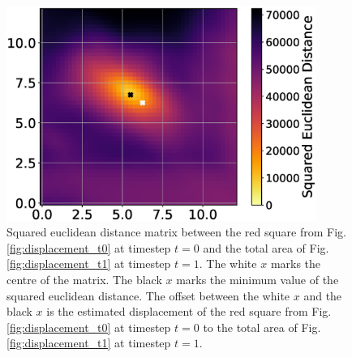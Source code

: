 \documentclass[11pt,twoside,a4paper,fleqn,x11names]{report}
\numberwithin{equation}{chapter}
\numberwithin{figure}{chapter}
\numberwithin{table}{chapter}
\begin{document}
\begin{figure}[!htbp]
	\centering
	\includegraphics[width=0.9\textwidth,trim={5mm 0 5mm 0},clip]{Correlation_Matrix.eps}
	\caption{Squared euclidean distance matrix between the red square from Fig. \ref{fig:displacement_t0} at timestep $t=0$ and the total area of Fig. \ref{fig:displacement_t1} at timestep $t=1$. The white $x$ marks the centre of the matrix. The black $x$ marks the minimum value of the squared euclidean distance. The offset between the white $x$ and the black $x$ is the estimated displacement of the red square from Fig. \ref{fig:displacement_t0} at timestep $t=0$ to the total area of Fig. \ref{fig:displacement_t1} at timestep $t=1$.}
	\label{fig:corr_matrix}
\end{figure}
\end{document}
